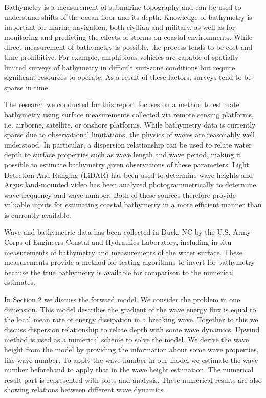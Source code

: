 Bathymetry is a measurement of submarine topography and can be used to understand shifts of the ocean floor and its depth. Knowledge of bathymetry is important for marine navigation, both civilian and military, as well as for monitoring and predicting the effects of storms on coastal environments. While direct measurement of bathymetry is possible, the process tends to be cost and time prohibitive. For example, amphibious vehicles are capable of spatially limited surveys of bathymetry in difficult surf-zone conditions but require significant resources to operate. As a result of these factors, surveys tend to be sparse in time. 

The research we conducted for this report focuses on a method to estimate bathymetry using surface measurements collected via remote sensing platforms, i.e. airborne, satellite, or onshore platforms. While bathymetry data is currently sparse due to observational limitations, the physics of waves are reasonably well understood. In particular, a dispersion relationship can be used to relate water depth to surface properties such as wave length and wave period, making it possible to estimate bathymetry given observations of these parameters. Light Detection And Ranging (LiDAR) has been used to determine wave heights and Argus land-mounted video has been analyzed photogrammetrically to determine wave frequency and wave number. Both of these sources therefore provide valuable inputs for estimating coastal bathymetry in a more efficient manner than is currently available.

Wave and bathymetric data has been collected in Duck, NC by the U.S. Army Corps of Engineers Coastal and Hydraulics Laboratory, including in situ measurements of bathymetry and measurements of the water surface. These measurements provide a method for testing algorithms to invert for bathymetry because the true bathymetry is available for comparison to the numerical estimates.

In Section 2 we discuss the forward model. We consider the problem in one dimension. This model describes the gradient of the wave energy flux is equal to the local mean rate of energy dissipation in a breaking wave. Together to this we discuss dispersion relationship to relate depth with some wave dynamics. Upwind method is used as a numerical scheme to solve the model. We derive the wave height from the model by providing the information about some wave properties, like wave number. To apply the wave number in our model we estimate the wave number beforehand to apply that in the wave height estimation. The numerical result part is represented with plots and analysis. These numerical results are also showing relations between different wave dynamics.    
